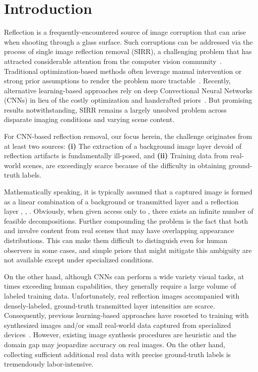 \documentclass[10pt,twocolumn,letterpaper]{article}
\begin{document}
\section{Introduction}
Reflection is a frequently-encountered source of image corruption that can arise when shooting through a glass surface. Such corruptions can be addressed via the process of single image reflection removal (SIRR), a challenging problem that has attracted considerable attention from the computer vision community~\cite{levin2007user,Li2014Single,wan2016depth,Arvanitopoulos_2017_CVPR,fan2017generic,zhang2018single,eccv18refrmv,Wan_2018_CVPR}. Traditional optimization-based methods often leverage manual intervention or strong prior assumptions to render the problem more tractable~\cite{levin2007user,Li2014Single}. Recently, alternative learning-based approaches rely  on  deep Convectional Neural Networks (CNNs) in lieu of the costly optimization and handcrafted priors~\cite{fan2017generic,zhang2018single,eccv18refrmv,Wan_2018_CVPR}. But promising results notwithstanding, SIRR remains a largely unsolved problem across disparate imaging conditions and varying scene content.

For CNN-based reflection removal, our focus herein, the challenge originates from at least two sources: \textbf{(i)} The extraction of a background image layer devoid of reflection artifacts is fundamentally ill-posed, and \textbf{(ii)} Training data from real-world scenes, are exceedingly scarce because of the difficulty in obtaining ground-truth labels.  

Mathematically speaking, it is typically assumed that a captured image  is formed as a linear combination of a background or transmitted layer  and a reflection layer , \ie, .  Obviously, when given access only to , there exists an infinite number of feasible decompositions.  Further compounding the problem is the fact that both  and  involve content from real scenes that may have overlapping appearance distributions. This can make them difficult to distinguish even for human observers in some cases, and simple priors that might mitigate this ambiguity are not available except under specialized conditions.

On the other hand, although CNNs can perform a wide variety visual tasks, at times exceeding human capabilities, they generally require a large volume of labeled training data. Unfortunately, 
real reflection images accompanied with densely-labeled, ground-truth transmitted layer intensities are scarce. Consequently, previous learning-based approaches have resorted to training with synthesized images \cite{fan2017generic,Wan_2018_CVPR,zhang2018single} and/or small real-world data captured from specialized devices~\cite{zhang2018single}. However, existing image synthesis procedures are heuristic and the domain gap may jeopardize accuracy on real images. On the other hand, collecting sufficient additional real data with precise ground-truth labels is tremendously labor-intensive.
\end{document}

